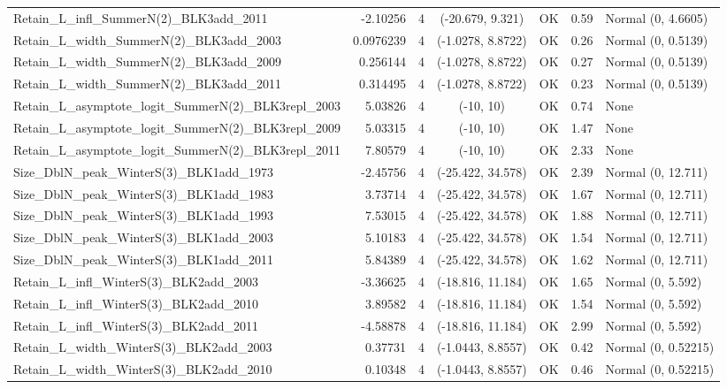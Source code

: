 \documentclass[12pt,]{article}
\begin{document}
\begin{landscape}
\begin{longtable}{lrcccll}
  Retain\_L\_infl\_SummerN(2)\_BLK3add\_2011 & -2.10256 & 4 & (-20.679, 9.321) & OK & 0.59 & Normal (0, 4.6605) \\ 
  Retain\_L\_width\_SummerN(2)\_BLK3add\_2003 & 0.0976239 & 4 & (-1.0278, 8.8722) & OK & 0.26 & Normal (0, 0.5139) \\ 
  Retain\_L\_width\_SummerN(2)\_BLK3add\_2009 & 0.256144 & 4 & (-1.0278, 8.8722) & OK & 0.27 & Normal (0, 0.5139) \\ 
  Retain\_L\_width\_SummerN(2)\_BLK3add\_2011 & 0.314495 & 4 & (-1.0278, 8.8722) & OK & 0.23 & Normal (0, 0.5139) \\ 
  Retain\_L\_asymptote\_logit\_SummerN(2)\_BLK3repl\_2003 & 5.03826 & 4 & (-10, 10) & OK & 0.74 & None \\ 
  Retain\_L\_asymptote\_logit\_SummerN(2)\_BLK3repl\_2009 & 5.03315 & 4 & (-10, 10) & OK & 1.47 & None \\ 
  Retain\_L\_asymptote\_logit\_SummerN(2)\_BLK3repl\_2011 & 7.80579 & 4 & (-10, 10) & OK & 2.33 & None \\ 
  Size\_DblN\_peak\_WinterS(3)\_BLK1add\_1973 & -2.45756 & 4 & (-25.422, 34.578) & OK & 2.39 & Normal (0, 12.711) \\ 
  Size\_DblN\_peak\_WinterS(3)\_BLK1add\_1983 & 3.73714 & 4 & (-25.422, 34.578) & OK & 1.67 & Normal (0, 12.711) \\ 
  Size\_DblN\_peak\_WinterS(3)\_BLK1add\_1993 & 7.53015 & 4 & (-25.422, 34.578) & OK & 1.88 & Normal (0, 12.711) \\ 
  Size\_DblN\_peak\_WinterS(3)\_BLK1add\_2003 & 5.10183 & 4 & (-25.422, 34.578) & OK & 1.54 & Normal (0, 12.711) \\ 
  Size\_DblN\_peak\_WinterS(3)\_BLK1add\_2011 & 5.84389 & 4 & (-25.422, 34.578) & OK & 1.62 & Normal (0, 12.711) \\ 
  Retain\_L\_infl\_WinterS(3)\_BLK2add\_2003 & -3.36625 & 4 & (-18.816, 11.184) & OK & 1.65 & Normal (0, 5.592) \\ 
  Retain\_L\_infl\_WinterS(3)\_BLK2add\_2010 & 3.89582 & 4 & (-18.816, 11.184) & OK & 1.54 & Normal (0, 5.592) \\ 
  Retain\_L\_infl\_WinterS(3)\_BLK2add\_2011 & -4.58878 & 4 & (-18.816, 11.184) & OK & 2.99 & Normal (0, 5.592) \\ 
  Retain\_L\_width\_WinterS(3)\_BLK2add\_2003 & 0.37731 & 4 & (-1.0443, 8.8557) & OK & 0.42 & Normal (0, 0.52215) \\ 
  Retain\_L\_width\_WinterS(3)\_BLK2add\_2010 & 0.10348 & 4 & (-1.0443, 8.8557) & OK & 0.46 & Normal (0, 0.52215) \\ 

\end{longtable}
\end{landscape}
\end{document}
